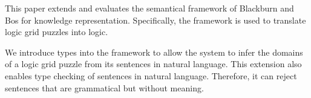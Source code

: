 This paper extends and evaluates the semantical framework of Blackburn and Bos for knowledge representation. Specifically, the framework is used to translate logic grid puzzles into logic.


We introduce types into the framework to allow the system to infer the domains of a logic grid puzzle from its sentences in natural language. This extension also enables type checking of sentences in natural language. Therefore, it can reject sentences that are grammatical but without meaning.

